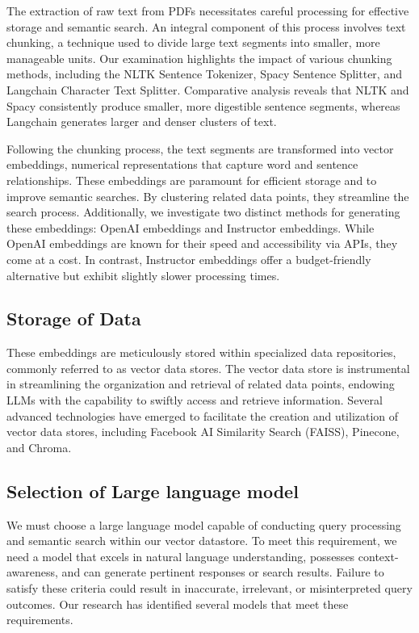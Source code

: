 \documentclass[fleqn,10pt]{thescipub} %
\begin{document}
The extraction of raw text from PDFs necessitates careful processing for effective storage and semantic search. An integral component of this process involves text chunking, a technique used to divide large text segments into smaller, more manageable units. Our examination highlights the impact of various chunking methods, including the NLTK Sentence Tokenizer, Spacy Sentence Splitter, and Langchain Character Text Splitter. Comparative analysis reveals that NLTK and Spacy consistently produce smaller, more digestible sentence segments, whereas Langchain generates larger and denser clusters of text.

Following the chunking process, the text segments are transformed into vector embeddings, numerical representations that capture word and sentence relationships. These embeddings are paramount for efficient storage and to improve semantic searches. By clustering related data points, they streamline the search process. Additionally, we investigate two distinct methods for generating these embeddings: OpenAI embeddings and Instructor embeddings. While OpenAI embeddings are known for their speed and accessibility via APIs, they come at a cost. In contrast, Instructor embeddings offer a budget-friendly alternative but exhibit slightly slower processing times.

\subsection{Storage of Data}

These embeddings are meticulously stored within specialized data repositories, commonly referred to as vector data stores. The vector data store is instrumental in streamlining the organization and retrieval of related data points, endowing LLMs with the capability to swiftly access and retrieve information. Several advanced technologies have emerged to facilitate the creation and utilization of vector data stores, including Facebook AI Similarity Search (FAISS), Pinecone, and Chroma. 

\subsection{Selection of Large language model}
We must choose a large language model capable of conducting query processing and semantic search within our vector datastore. To meet this requirement, we need a model that excels in natural language understanding, possesses context-awareness, and can generate pertinent responses or search results. Failure to satisfy these criteria could result in inaccurate, irrelevant, or misinterpreted query outcomes. Our research has identified several models that meet these requirements.
\end{document}
